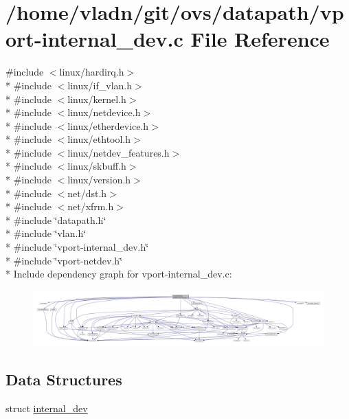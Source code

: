 \hypertarget{vport-internal__dev_8c}{}\section{/home/vladn/git/ovs/datapath/vport-\/internal\+\_\+dev.c File Reference}
\label{vport-internal__dev_8c}
{\ttfamily \#include $<$linux/hardirq.\+h$>$}\\*
{\ttfamily \#include $<$linux/if\+\_\+vlan.\+h$>$}\\*
{\ttfamily \#include $<$linux/kernel.\+h$>$}\\*
{\ttfamily \#include $<$linux/netdevice.\+h$>$}\\*
{\ttfamily \#include $<$linux/etherdevice.\+h$>$}\\*
{\ttfamily \#include $<$linux/ethtool.\+h$>$}\\*
{\ttfamily \#include $<$linux/netdev\+\_\+features.\+h$>$}\\*
{\ttfamily \#include $<$linux/skbuff.\+h$>$}\\*
{\ttfamily \#include $<$linux/version.\+h$>$}\\*
{\ttfamily \#include $<$net/dst.\+h$>$}\\*
{\ttfamily \#include $<$net/xfrm.\+h$>$}\\*
{\ttfamily \#include \char`\"{}datapath.\+h\char`\"{}}\\*
{\ttfamily \#include \char`\"{}vlan.\+h\char`\"{}}\\*
{\ttfamily \#include \char`\"{}vport-\/internal\+\_\+dev.\+h\char`\"{}}\\*
{\ttfamily \#include \char`\"{}vport-\/netdev.\+h\char`\"{}}\\*
Include dependency graph for vport-\/internal\+\_\+dev.c\+:
\nopagebreak
\begin{figure}[H]
\begin{center}
\leavevmode
\includegraphics[width=350pt]{vport-internal__dev_8c__incl}
\end{center}
\end{figure}
\subsection*{Data Structures}
\begin{DoxyCompactItemize}
\item 
struct \hyperlink{structinternal__dev}{internal\+\_\+dev}
\end{DoxyCompactItemize}

